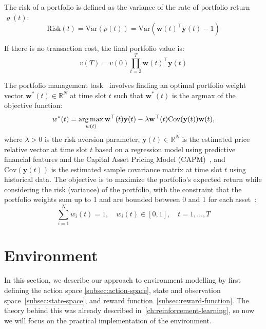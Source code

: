 \documentclass[../xlapes02]{subfiles}
\begin{document}
    The risk of a portfolio is defined as the variance of the rate of portfolio return $\varrho(t)$:
    \begin{equation}
        \text{Risk}(t)=\text{Var}(\rho(t))=\text{Var}(\mathbf{w}(t)^\top \mathbf{y}(t) - 1)
    \end{equation}

    If there is no transaction cost, the final portfolio value is:
    \begin{equation}
        v(T) = v(0) \prod_{t=2}^T\mathbf{w}(t)^\top \mathbf{y}(t)
    \end{equation}

    The portfolio management task~\cite{enwiki:1043516653} involves finding an optimal portfolio weight vector $\mathbf{w}^*(t) \in \mathbb{R}^N$ at time slot $t$ such that $\mathbf{w}^*(t)$ is the argmax of the objective function:
    \begin{equation}
        w^*(t)=\operatorname*{arg\,max}_{w(t)}\mathbf{w}^\top(t)\mathbf{y}(t)-\lambda\mathbf{w}^\top(t)\text{Cov}(\mathbf{y}(t))\mathbf{w}(t),
    \end{equation}
    where $\lambda > 0$ is the risk aversion parameter, $\mathbf{y}(t) \in \mathbb{R}^N$ is the estimated price relative vector at time slot $t$ based on a regression model using predictive financial features and the Capital Asset Pricing Model (CAPM)~\cite{fama-2004}, and $\text{Cov}(\mathbf{y}(t))$ is the estimated sample covariance matrix at time slot $t$ using historical data. The objective is to maximize the portfolio's expected return while considering the risk (variance) of the portfolio, with the constraint that the portfolio weights sum up to 1 and are bounded between 0 and 1 for each asset~\cite{finrl-portfolio-allocation-2020}:
    \begin{equation}
        \sum_{i=1}^{N}w_i(t)=1,\quad w_i(t)\in[0,1],\quad t=1,\ldots,T
    \end{equation}


    \section{Environment}\label{sec:environment}
    In this section, we describe our approach to environment modelling by first defining the action space \cref{subsec:action-space}, state and observation space~\cref{subsec:state-space}, and reward function~\cref{subsec:reward-function}. The theory behind this was already described in~\cref{ch:reinforcement-learning}, so now we will focus on the practical implementation of the environment.
\end{document}

